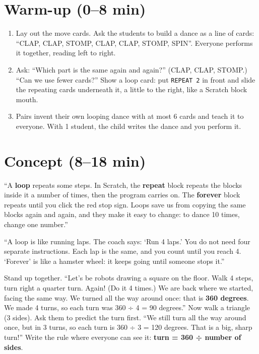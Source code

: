 \section{Warm-up (0--8 min)}
\begin{unplugged}
\begin{enumerate}[leftmargin=1.4em,itemsep=1pt]
  \item Lay out the move cards. Ask the students to build a dance as a line of cards: \enquote{CLAP, CLAP, STOMP, CLAP, CLAP, STOMP, SPIN}. Everyone performs it together, reading left to right.
  \item Ask: \enquote{Which part is the same again and again?} (CLAP, CLAP, STOMP.) \enquote{Can we use fewer cards?} Show a loop card: put \texttt{REPEAT 2} in front and slide the repeating cards underneath it, a little to the right, like a Scratch block mouth.
  \item Pairs invent their own looping dance with at most 6 cards and teach it to everyone. With 1 student, the child writes the dance and you perform it.
\end{enumerate}
\end{unplugged}

\section{Concept (8--18 min)}
\begin{teacherscript}
\enquote{A \textbf{loop} repeats some steps. In Scratch, the \textbf{repeat} block repeats the blocks inside it a number of times, then the program carries on. The \textbf{forever} block repeats until you click the red stop sign. Loops save us from copying the same blocks again and again, and they make it easy to change: to dance 10 times, change one number.}
\end{teacherscript}

\begin{analogy}
\enquote{A loop is like running laps. The coach says: \enquote{Run 4 laps.} You do not need four separate instructions. Each lap is the same, and you count until you reach 4. \enquote{Forever} is like a hamster wheel: it keeps going until someone stops it.}
\end{analogy}

\begin{teacherscript}
Stand up together. \enquote{Let's be robots drawing a square on the floor. Walk 4 steps, turn right a quarter turn. Again! (Do it 4 times.) We are back where we started, facing the same way. We turned all the way around once: that is \textbf{360 degrees}. We made 4 turns, so each turn was 360 ÷ 4 = 90 degrees.}
Now walk a triangle (3 sides). Ask them to predict the turn first. \enquote{We still turn all the way around once, but in 3 turns, so each turn is 360 ÷ 3 = 120 degrees. That is a big, sharp turn!} Write the rule where everyone can see it: \textbf{turn = 360 ÷ number of sides}.
\end{teacherscript}


